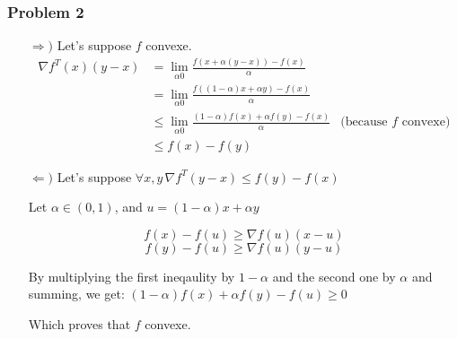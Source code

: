 \documentclass[12pt]{article}
\newcommand{\Q}[1]{\subsubsection*{Problem #1}}
\begin{document}
\Q{2}

\begin{itemize}
\item[$\Rightarrow)$] Let's suppose $f$ convexe.
  \begin{align*}
    \nabla f^T(x) (y-x)
    &= \lim_{\alpha 0} \frac{f(x + \alpha(y-x)) - f(x)}{\alpha}
    \\&= \lim_{\alpha 0} \frac{f((1-\alpha)x + \alpha y) - f(x)}{\alpha}
    \\&\le \lim_{\alpha 0} \frac{(1-\alpha)f(x) + \alpha f(y) - f(x)}{\alpha} &\text{(because $f$ convexe)}
    \\&\le f(x) - f(y)
  \end{align*}
\item[$\Leftarrow)$] Let's suppose $\forall x, y \, \nabla f^T (y-x) \le f(y) - f(x)$
  
  Let $\alpha \in (0, 1)$, and $u = (1-\alpha)x + \alpha y$
  
  $$f(x) - f(u) \ge \nabla f(u) (x-u)$$
  $$f(y) - f(u) \ge \nabla f(u) (y-u)$$

  By multiplying the first ineqaulity by $1-\alpha$ and the second one by $\alpha$ and summing, we get:
  $(1-\alpha) f(x) + \alpha f(y) - f(u) \ge 0$

  Which proves that $f$ convexe.
\end{itemize}
\end{document}
